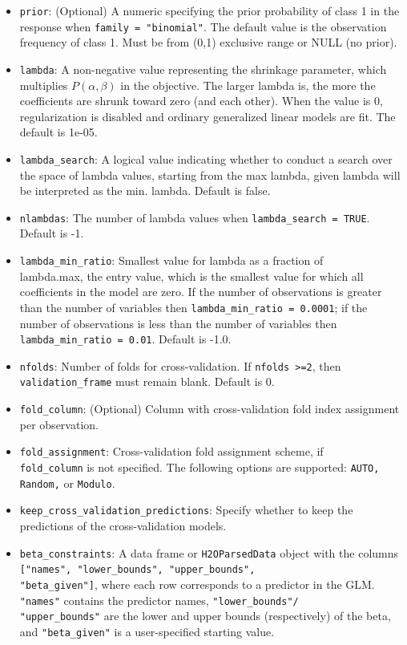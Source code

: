 \begin{itemize}
\item \texttt{prior}: (Optional) A numeric specifying the prior probability of class 1 in the response when \texttt{family = "binomial"}. The default value is the observation frequency of class 1. Must be from (0,1) exclusive range or NULL (no prior).
\item \texttt{lambda}: A non-negative value representing the shrinkage parameter, which multiplies $P(\alpha,\beta)$ in the objective. The larger lambda is, the more the coefficients are shrunk toward zero (and each other). When the value is 0, regularization is disabled and ordinary generalized linear models are fit. The default is 1e-05.
\item \texttt{lambda\_search}: A logical value indicating whether to conduct a search over the space of lambda values, starting from the max lambda, given lambda will be interpreted as the min. lambda. Default is false.
\item \texttt{nlambdas}: The number of lambda values when \texttt{lambda\_search = TRUE}. Default is -1.
\item \texttt{lambda\_min\_ratio}: Smallest value for lambda as a fraction of \\ lambda.max, the entry value, which is the smallest value for which all coefficients in the model are zero. If the number of observations is greater than the number of variables then \texttt{lambda\_min\_ratio = 0.0001}; if the number of observations is less than the number of variables then \texttt{lambda\_min\_ratio = 0.01}. Default is -1.0.
\item \texttt{nfolds}: Number of folds for cross-validation. If \texttt{nfolds >=2}, then \texttt{validation\_frame} must remain blank. Default is 0. %
\item \texttt{fold\_column}: (Optional) Column with cross-validation fold index assignment per observation. 
\item \texttt{fold\_assignment}: Cross-validation fold assignment scheme, if \\ \texttt{fold\_column} is not specified. The following options are supported: \texttt{AUTO, Random,} or \texttt{Modulo}. 
\item \texttt{keep\_cross\_validation\_predictions}: Specify whether to keep the predictions of the cross-validation models. 
\item \texttt{beta\_constraints}: A data frame or \texttt{H2OParsedData} object with the columns \texttt{["names", "lower\_bounds", "upper\_bounds", \\ "beta\_given"]}, where each row corresponds to a predictor in the GLM. \texttt{"names"} contains the predictor names, \texttt{"lower\_bounds"/ \\ "upper\_bounds"} are the lower and upper bounds (respectively) of the beta, and  \texttt{"beta\_given"} is a user-specified starting value. 

\end{itemize}
